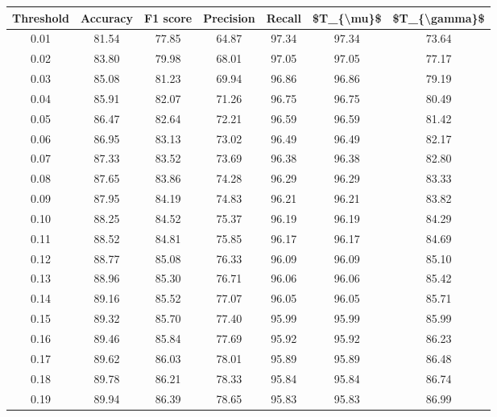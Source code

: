 \begin{tabular}{|c|c|c|c|c|c|c|}
\hline
 Threshold &  Accuracy &  F1 score &  Precision &  Recall &  \$T\_\{\textbackslash mu\}\$ &  \$T\_\{\textbackslash gamma\}\$ \\
\hline
      0.01 &     81.54 &     77.85 &      64.87 &   97.34 &      97.34 &         73.64 \\
      0.02 &     83.80 &     79.98 &      68.01 &   97.05 &      97.05 &         77.17 \\
      0.03 &     85.08 &     81.23 &      69.94 &   96.86 &      96.86 &         79.19 \\
      0.04 &     85.91 &     82.07 &      71.26 &   96.75 &      96.75 &         80.49 \\
      0.05 &     86.47 &     82.64 &      72.21 &   96.59 &      96.59 &         81.42 \\
      0.06 &     86.95 &     83.13 &      73.02 &   96.49 &      96.49 &         82.17 \\
      0.07 &     87.33 &     83.52 &      73.69 &   96.38 &      96.38 &         82.80 \\
      0.08 &     87.65 &     83.86 &      74.28 &   96.29 &      96.29 &         83.33 \\
      0.09 &     87.95 &     84.19 &      74.83 &   96.21 &      96.21 &         83.82 \\
      0.10 &     88.25 &     84.52 &      75.37 &   96.19 &      96.19 &         84.29 \\
      0.11 &     88.52 &     84.81 &      75.85 &   96.17 &      96.17 &         84.69 \\
      0.12 &     88.77 &     85.08 &      76.33 &   96.09 &      96.09 &         85.10 \\
      0.13 &     88.96 &     85.30 &      76.71 &   96.06 &      96.06 &         85.42 \\
      0.14 &     89.16 &     85.52 &      77.07 &   96.05 &      96.05 &         85.71 \\
      0.15 &     89.32 &     85.70 &      77.40 &   95.99 &      95.99 &         85.99 \\
      0.16 &     89.46 &     85.84 &      77.69 &   95.92 &      95.92 &         86.23 \\
      0.17 &     89.62 &     86.03 &      78.01 &   95.89 &      95.89 &         86.48 \\
      0.18 &     89.78 &     86.21 &      78.33 &   95.84 &      95.84 &         86.74 \\
      0.19 &     89.94 &     86.39 &      78.65 &   95.83 &      95.83 &         86.99 \\

\end{tabular}
